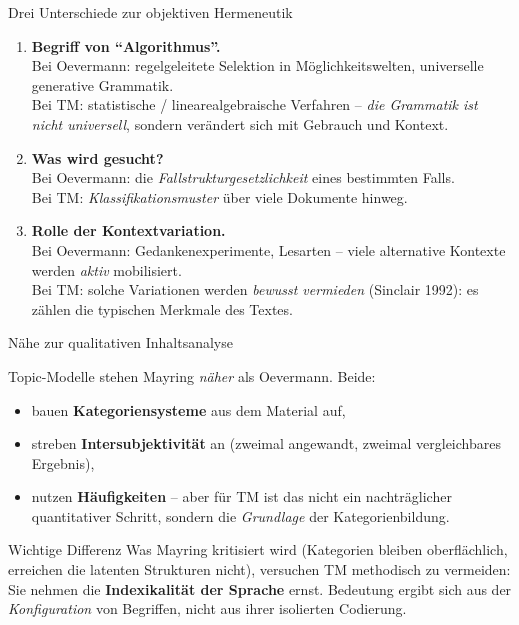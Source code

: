 \documentclass[aspectratio=169,11pt]{beamer}
\let\oldemph\emph
\renewcommand{\emph}[1]{{\color{solCyan}\oldemph{#1}}}
\let\oldtextbf\textbf
\renewcommand{\textbf}[1]{{\color{solBase3}\oldtextbf{#1}}}
\begin{document}
\begin{frame}{Drei Unterschiede zur objektiven Hermeneutik}

  \begin{enumerate}
    \item \textbf{Begriff von \enquote{Algorithmus}.} \\
          Bei Oevermann: regelgeleitete Selektion in
          Möglichkeitswelten, universelle generative Grammatik.\\
          Bei TM: statistische / linearealgebraische Verfahren –
          \emph{die Grammatik ist nicht universell}, sondern verändert
          sich mit Gebrauch und Kontext.
    \vfill
    \item \textbf{Was wird gesucht?} \\
          Bei Oevermann: die \emph{Fallstrukturgesetzlichkeit} eines
          bestimmten Falls.\\
          Bei TM: \emph{Klassifikationsmuster} über viele Dokumente
          hinweg.
    \vfill
    \item \textbf{Rolle der Kontextvariation.} \\
          Bei Oevermann: Gedankenexperimente, Lesarten – viele
          alternative Kontexte werden \emph{aktiv} mobilisiert.\\
          Bei TM: solche Variationen werden \emph{bewusst vermieden}
          (Sinclair 1992): es zählen die typischen Merkmale des Textes.
  \end{enumerate}

\end{frame}

\begin{frame}{Nähe zur qualitativen Inhaltsanalyse}

  Topic-Modelle stehen Mayring \emph{näher} als Oevermann.
  Beide:
  \vfill
  \begin{itemize}
    \item bauen \textbf{Kategoriensysteme} aus dem Material auf,
    \item streben \textbf{Intersubjektivität} an (zweimal angewandt,
          zweimal vergleichbares Ergebnis),
    \item nutzen \textbf{Häufigkeiten} – aber für TM ist das nicht
          ein nachträglicher quantitativer Schritt, sondern die
          \emph{Grundlage} der Kategorienbildung.
  \end{itemize}

  \vfill
  \begin{block}{Wichtige Differenz}
    Was Mayring kritisiert wird (Kategorien bleiben oberflächlich,
    erreichen die latenten Strukturen nicht), versuchen TM
    methodisch zu vermeiden:
    \\[4pt]
    Sie nehmen die \textbf{Indexikalität der Sprache} ernst.
    Bedeutung ergibt sich aus der \emph{Konfiguration} von Begriffen,
    nicht aus ihrer isolierten Codierung.
  \end{block}

\end{frame}
\end{document}
